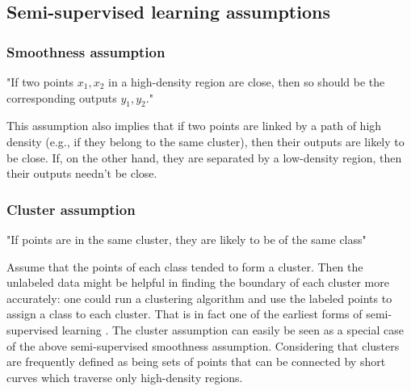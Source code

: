 \documentclass[12pt]{article}
\theoremstyle{definition}
\DeclareRobustCommand{\[}{\begin{equation}}
\DeclareRobustCommand{\]}{\end{equation}}
\begin{document}
\subsection{Semi-supervised learning assumptions}
    \subsubsection{Smoothness assumption}
        "If two points $x_1, x_2$ in a high-density region are close, then so should be the corresponding outputs $y_1, y_2$." \par
        This assumption also implies that if two points are linked by
        a path of high density (e.g., if they belong to the same cluster), then their outputs
        are likely to be close. If, on the other hand, they are separated by a low-density
        region, then their outputs needn't be close. \cite{Semi-Supervised-Book}
        
    \subsubsection{Cluster assumption}
        "If points are in the same cluster, they are likely to be of the
        same class" \par
        Assume that the points of each class tended to form a cluster. Then the
        unlabeled data might be helpful in finding the boundary of each cluster more accurately:
        one could run a clustering algorithm and use the labeled points to assign a class
        to each cluster. That is in fact one of the earliest forms of semi-supervised learning
        \cite{Semi-Supervised-Book}. 
        The cluster assumption can easily be seen as a special case of the above
        semi-supervised smoothness assumption. Considering that clusters are frequently
        defined as being sets of points that can be connected by short curves which traverse
        only high-density regions. \cite{Semi-Supervised-Book}
    
\end{document}

